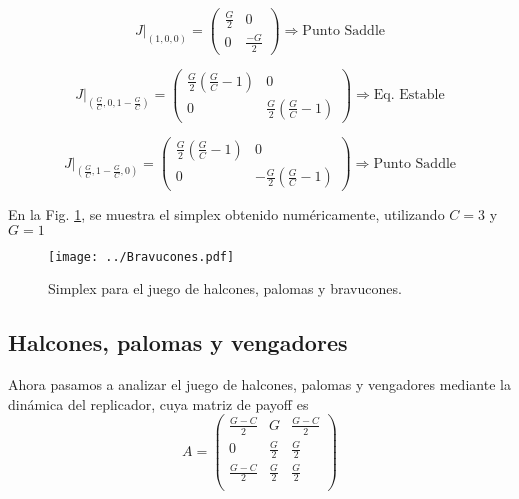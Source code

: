 \begin{equation}
J |_{\left(1,0,0\right)} =
\begin{pmatrix}
    \frac{G}{2}  & 0 \\[4pt]
    0       & \frac{-G}{2}
\end{pmatrix}
\Rightarrow \text{Punto Saddle}
\end{equation}


\begin{equation}
J |_{\left(\frac{G}{C},0,1-\frac{G}{C}\right)} =
\begin{pmatrix}
    \frac{G}{2} \left( \frac{G}{C} -1 \right)  & 0 \\[4pt]
    0       & \frac{G}{2} \left( \frac{G}{C} -1 \right)
\end{pmatrix}
\Rightarrow \text{Eq. Estable}
\end{equation}


\begin{equation}
J |_{\left(\frac{G}{C},1-\frac{G}{C},0\right)} =
\begin{pmatrix}
    \frac{G}{2} \left( \frac{G}{C} -1 \right)  & 0 \\[4pt]
    0       & -\frac{G}{2} \left( \frac{G}{C} -1 \right)
\end{pmatrix}
\Rightarrow \text{Punto Saddle}
\end{equation}

En la Fig. \ref{ej1:Bravucones}, se muestra el simplex obtenido numéricamente, utilizando $C=3$ y $G=1$ 


\begin{figure}[htb!]
    \centering
    \texttt{[image: ../Bravucones.pdf]}
    \caption{Simplex para el juego de halcones, palomas y bravucones.}
    \label{ej1:Bravucones}
\end{figure}



\subsection*{Halcones, palomas y vengadores}

Ahora pasamos a analizar el juego de halcones, palomas y vengadores mediante la dinámica del replicador, cuya matriz de payoff es
\begin{equation}
    A =
\begin{pmatrix}
\frac{G-C}{2} & G & \frac{G-C}{2} \\[6pt]
0 & \frac{G}{2} & \frac{G}{2} \\[6pt]
\frac{G-C}{2} & \frac{G}{2} & \frac{G}{2} \\
\end{pmatrix}
\end{equation}

